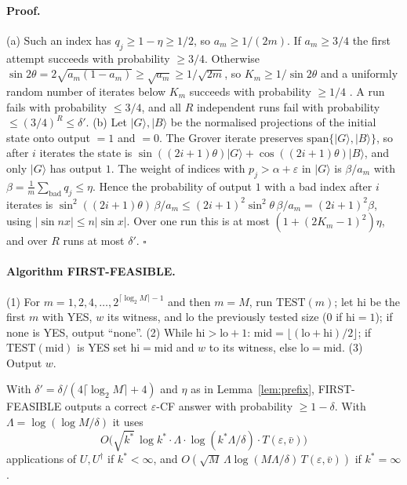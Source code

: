 \paragraph{Proof.} (a) Such an index has $q_j\ge1-\eta\ge1/2$, so $a_m\ge1/(2m)$. If $a_m\ge3/4$ the first attempt succeeds with probability $\ge3/4$. Otherwise $\sin2\theta=2\sqrt{a_m(1-a_m)}\ge\sqrt{a_m}\ge1/\sqrt{2m}$, so $K_m\ge1/\sin2\theta$ and a uniformly random number of iterates below $K_m$ succeeds with probability $\ge1/4$ \citep[Lemma 2]{boyer1998tight}. A run fails with probability $\le3/4$, and all $R$ independent runs fail with probability $\le(3/4)^R\le\delta'$.
(b) Let $|G\rangle,|B\rangle$ be the normalised projections of the initial state onto output $=1$ and $=0$. The Grover iterate preserves $\mathrm{span}\{|G\rangle,|B\rangle\}$, so after $i$ iterates the state is $\sin((2i+1)\theta)|G\rangle+\cos((2i+1)\theta)|B\rangle$, and only $|G\rangle$ has output $1$. The weight of indices with $p_j>\alpha+\varepsilon$ in $|G\rangle$ is $\beta/a_m$ with $\beta=\frac1m\sum_{\text{bad}}q_j\le\eta$. Hence the probability of output $1$ with a bad index after $i$ iterates is $\sin^2((2i+1)\theta)\,\beta/a_m\le(2i+1)^2\sin^2\theta\,\beta/a_m=(2i+1)^2\beta$, using $|\sin nx|\le n|\sin x|$. Over one run this is at most $(1+(2K_m-1)^2)\eta$, and over $R$ runs at most $\delta'$. \hfill$\square$

\paragraph{Algorithm FIRST-FEASIBLE.} (1) For $m=1,2,4,\dots,2^{\lceil\log_2M\rceil-1}$ and then $m=M$, run $\mathrm{TEST}(m)$; let $\mathrm{hi}$ be the first $m$ with YES, $w$ its witness, and $\mathrm{lo}$ the previously tested size ($0$ if $\mathrm{hi}=1$); if none is YES, output ``none''. (2) While $\mathrm{hi}>\mathrm{lo}+1$: $\mathrm{mid}=\lfloor(\mathrm{lo}+\mathrm{hi})/2\rfloor$; if $\mathrm{TEST}(\mathrm{mid})$ is YES set $\mathrm{hi}=\mathrm{mid}$ and $w$ to its witness, else $\mathrm{lo}=\mathrm{mid}$. (3) Output $w$.

\begin{theorem}\label{thm:first}
With $\delta'=\delta/(4\lceil\log_2M\rceil+4)$ and $\eta$ as in Lemma~\ref{lem:prefix}, FIRST-FEASIBLE outputs a correct $\varepsilon$-CF answer with probability $\ge1-\delta$. With $\Lambda=\log(\log M/\delta)$ it uses
\[
O\big(\sqrt{k^*}\,\log k^*\cdot\Lambda\cdot\log(k^*\Lambda/\delta)\cdot T(\varepsilon,\bar v)\big)
\]
applications of $U,U^\dagger$ if $k^*<\infty$, and $O(\sqrt M\,\Lambda\log(M\Lambda/\delta)\,T(\varepsilon,\bar v))$ if $k^*=\infty$.
\end{theorem}
